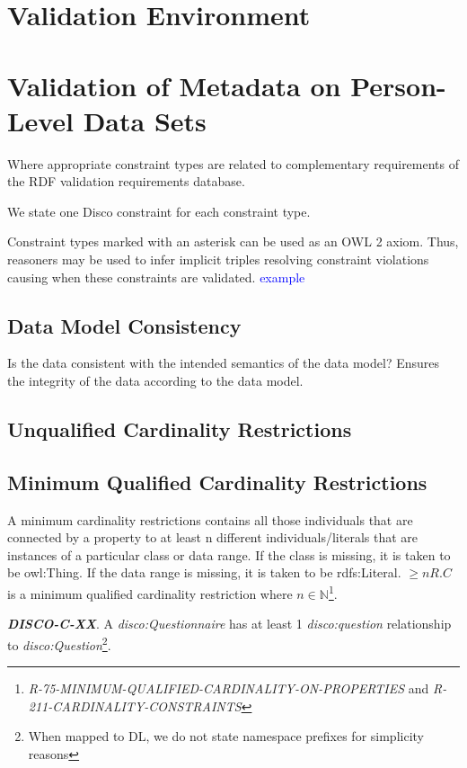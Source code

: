 \documentclass{elsart3p}    %
\begin{document}
\section{Validation Environment}

\section{Validation of Metadata on Person-Level Data Sets}

Where appropriate constraint types are related to complementary requirements of the RDF validation requirements database.

We state one Disco constraint for each constraint type.

Constraint types marked with an asterisk can be used as an OWL 2 axiom.
Thus, reasoners may be used to infer implicit triples resolving constraint violations causing when these constraints are validated.
\textcolor{blue}{example}

\subsection{Data Model Consistency}

Is the data consistent with the intended semantics of the data model?
Ensures the integrity of the data according to the data model.

\subsection{Unqualified Cardinality Restrictions}

\subsection{Minimum Qualified Cardinality Restrictions}

A minimum cardinality restrictions contains all those individuals that are connected by a property to at least n different individuals/literals 
that are instances of a particular class or data range. If the class is missing, it is taken to be owl:Thing. 
If the data range is missing, it is taken to be rdfs:Literal.
$\geq n R. C$ is a minimum qualified cardinality restriction where $n \in \mathbb{N}$\footnote{{\em R-75-MINIMUM-QUALIFIED-CARDINALITY-ON-PROPERTIES} and {\em R-211-CARDINALITY-CONSTRAINTS}}.

\textbf{{\em DISCO-C-XX}}.
A {\em disco:Questionnaire} has at least 1 {\em disco:question} relationship to {\em disco:Question}\footnote{When mapped to DL, we do not state namespace prefixes for simplicity reasons}.
\end{document}
